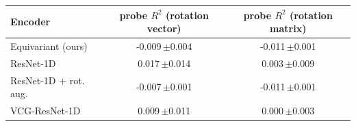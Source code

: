 \begin{tabular}{lcc}
\toprule
Encoder & probe $R^2$ (rotation vector) & probe $R^2$ (rotation matrix) \\
\midrule
  Equivariant (ours) & -0.009\,\tiny{$\pm$0.004} & -0.011\,\tiny{$\pm$0.001} \\
  ResNet-1D & 0.017\,\tiny{$\pm$0.014} & 0.003\,\tiny{$\pm$0.009} \\
  ResNet-1D + rot. aug. & -0.007\,\tiny{$\pm$0.001} & -0.011\,\tiny{$\pm$0.001} \\
  VCG-ResNet-1D & 0.009\,\tiny{$\pm$0.011} & 0.000\,\tiny{$\pm$0.003} \\
\bottomrule
\end{tabular}